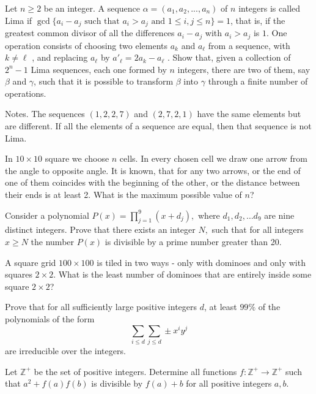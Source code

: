 \documentclass[11pt]{scrartcl}
\begin{document}
\begin{problem}[4514183051583887150]
Let $n\ge 2$ be an integer. A sequence $\alpha = (a_1, a_2,..., a_n)$ of $n$ integers is called Lima if $\gcd \{a_i - a_j \text{ such that } a_i> a_j \text{ and } 1\le i, j\le n\} = 1$, that is, if the greatest common divisor of all the differences $a_i - a_j$ with $a_i> a_j$ is $1$. One operation consists of choosing two elements $a_k$ and $a_{\ell}$ from a sequence, with $k\ne \ell $ , and replacing $a_{\ell}$ by $a'_{\ell}  = 2a_k - a_{\ell}$ .
Show that, given a collection of $2^n - 1$ Lima sequences, each one formed by $n$ integers, there are two of them, say $\beta$ and $\gamma$, such that it is possible to transform $\beta$ into $\gamma$ through a finite number of operations.

Notes.
The sequences $(1,2,2,7)$ and $(2,7,2,1)$ have the same elements but are different.
If all the elements of a sequence are equal, then that sequence is not Lima.
\end{problem}
\begin{problem}[5949258338135822858]
In $10\times 10$ square we choose $n$ cells. In every chosen cell we draw one arrow from the angle to opposite angle. It is known, that for any two arrows, or the end of one of them coincides with the beginning of the other, or
the distance between their ends is at least 2. What is the maximum possible value of $n$?
\end{problem}
\begin{problem}[643666520789113]
	Consider a polynomial $P(x) =  \prod^9_{j=1}(x+d_j),$ where $d_1, d_2, \ldots d_9$ are nine distinct integers. Prove that there exists an integer $N,$ such that for all integers $x \geq N$ the number $P(x)$ is divisible by a prime number greater than 20.
\end{problem}
\begin{problem}[799773800583372]
	A square grid $100 \times 100$ is tiled in two ways - only with dominoes and only with squares $2 \times 2$. What is the least number of dominoes that are entirely inside some square $2 \times 2$?
\end{problem}
\begin{problem}[1696528644272897376]
Prove that for all sufficiently large positive integers $d{}$, at least $99\%$ of the polynomials of the form\[\sum_{i\leqslant d}\sum_{j\leqslant d}\pm x^iy^j\]are irreducible over the integers.
\end{problem}
\begin{problem}[467342110469005]
Let $\mathbb{Z}^+$ be the set of positive integers. Determine all functions $f : \mathbb{Z}^+\to\mathbb{Z}^+$ such that $a^2+f(a)f(b)$ is divisible by $f(a)+b$ for all positive integers $a,b$.
\end{problem}
\end{document}
